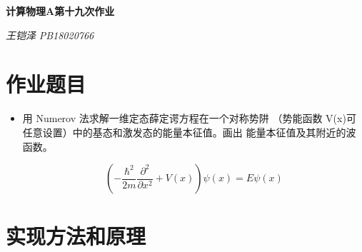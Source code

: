 \documentclass[UTF8]{ctexart}
\begin{document}
	\centering\textbf{\LARGE{计算物理A第十九次作业}}
	
	
	\textit{王铠泽}\qquad\textit{ PB18020766}
	
		
	\section{作业题目}
	
	\begin{itemize}
		\item 用 Numerov 法求解一维定态薛定谔方程在一个对称势阱
		（势能函数 V(x)可任意设置）中的基态和激发态的能量本征值。画出
		能量本征值及其附近的波函数。
		
		$$\left( -\frac{\hbar^2}{2m}\frac{\partial^2}{\partial x^2}+V(x)\right) \psi(x)=E\psi(x)$$
	\end{itemize}
	
	\section{实现方法和原理}
	
\end{document}
